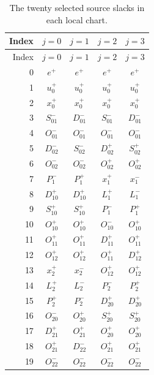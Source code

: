 \documentclass[11pt,reqno]{amsart}
\theoremstyle{definition}
\theoremstyle{remark}
\begin{document}
\begin{longtable}{rcccc}
\caption{The twenty selected source slacks in each local chart.}
\label{transport:slack-table}\\
\toprule
Index & \(j=0\) & \(j=1\) & \(j=2\) & \(j=3\)\\
\midrule
\endfirsthead
\toprule
Index & \(j=0\) & \(j=1\) & \(j=2\) & \(j=3\)\\
\midrule
\endhead
0 & \(e^+\) & \(e^+\) & \(e^+\) & \(e^+\)\\
1 & \(u_0^+\) & \(u_0^+\) & \(u_0^+\) & \(u_0^+\)\\
2 & \(x_0^+\) & \(x_0^+\) & \(x_0^+\) & \(x_0^+\)\\
3 & \(S_{01}^-\) & \(D_{01}^-\) & \(S_{01}^-\) & \(D_{01}^-\)\\
4 & \(O_{01}^-\) & \(O_{01}^-\) & \(O_{01}^-\) & \(O_{01}^-\)\\
5 & \(D_{02}^-\) & \(S_{02}^-\) & \(D_{02}^+\) & \(S_{02}^+\)\\
6 & \(O_{02}^-\) & \(O_{02}^-\) & \(O_{02}^+\) & \(O_{02}^+\)\\
7 & \(P_1^-\) & \(P_1^+\) & \(x_1^+\) & \(x_1^-\)\\
8 & \(D_{10}^+\) & \(D_{10}^+\) & \(L_1^+\) & \(L_1^-\)\\
9 & \(S_{10}^+\) & \(S_{10}^+\) & \(P_1^-\) & \(P_1^+\)\\
10 & \(O_{10}^+\) & \(O_{10}^+\) & \(O_{10}^-\) & \(O_{10}^+\)\\
11 & \(O_{11}^+\) & \(O_{11}^+\) & \(D_{11}^+\) & \(O_{11}^+\)\\
12 & \(O_{12}^+\) & \(O_{12}^+\) & \(O_{11}^+\) & \(D_{12}^+\)\\
13 & \(x_2^+\) & \(x_2^-\) & \(O_{12}^+\) & \(O_{12}^+\)\\
14 & \(L_2^+\) & \(L_2^-\) & \(P_2^-\) & \(P_2^+\)\\
15 & \(P_2^+\) & \(P_2^-\) & \(D_{20}^+\) & \(D_{20}^+\)\\
16 & \(O_{20}^-\) & \(O_{20}^+\) & \(S_{20}^+\) & \(S_{20}^+\)\\
17 & \(D_{21}^+\) & \(O_{21}^+\) & \(O_{20}^+\) & \(O_{20}^+\)\\
18 & \(O_{21}^+\) & \(D_{22}^-\) & \(O_{21}^+\) & \(O_{21}^+\)\\
19 & \(O_{22}^-\) & \(O_{22}^-\) & \(O_{22}^-\) & \(O_{22}^-\)\\
\bottomrule
\end{longtable}
\end{document}
